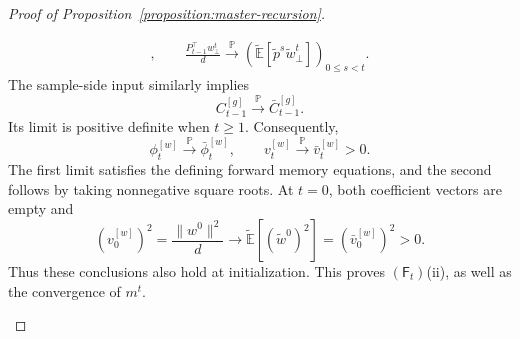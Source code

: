 \begin{proof}[Proof of Proposition~\ref{proposition:master-recursion}]
\begin{enumerate}[wide]
\begin{enumerate}[label=(\alph*),wide]
\[\begin{aligned}
            , \qquad
            \frac{P_{t-1}^\top w_\perp^t}{d}
            \xrightarrow{\mathbb P}
            \left(
                \tilde{\mathbb E}[\tilde p^s\tilde w_\perp^t]
            \right)_{0\leq s<t}.
        \end{aligned}
        \]
        The sample-side input similarly implies
        \[
            C_{t-1}^{[g]}
            \xrightarrow{\mathbb P}\bar C_{t-1}^{[g]}.
        \]
        Its limit is positive definite when $t\geq1$.
        Consequently,
        \[
            \phi_t^{[w]}
            \xrightarrow{\mathbb P}\bar\phi_t^{[w]},
            \qquad
            v_t^{[w]}
            \xrightarrow{\mathbb P}\bar v_t^{[w]}>0.
        \]
        The first limit satisfies the defining forward
        memory equations, and the second follows by taking
        nonnegative square roots.
        At $t=0$, both coefficient vectors are empty and
        \[
            (v_0^{[w]})^2
            =
            \frac{\|w^0\|^2}{d}
            \longrightarrow
            \tilde{\mathbb E}[(\tilde w^0)^2]
            =
            (\bar v_0^{[w]})^2>0.
        \]
        Thus these conclusions also hold at initialization.
        This proves $(\mathsf F_t)$(ii), as well as the convergence of $m^t$.


\end{enumerate}
\end{enumerate}
\end{proof}
